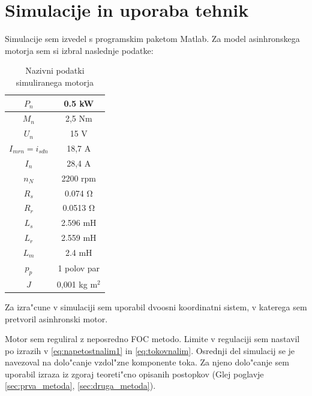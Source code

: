 \documentclass[journal,a4paper,twoside]{sty/IEEEtran}
\begin{document}
\section{Simulacije in uporaba tehnik}
Simulacije sem izvedel s programskim paketom Matlab. 
Za model asinhronskega motorja sem si izbral naslednje podatke:
\begin{table}
\centering
\label{tab:nazivni_podatki_motorja}
\caption{Nazivni podatki simuliranega motorja}
\begin{tabular}{|c|c|}
\hline
	$P_n$		&0.5 kW \\\hline
	$M_n$		&2,5 Nm \\\hline
	$U_n$		&	15 V\\\hline
	$I_{mrn}= i_{sdn}$&	18,7 A\\\hline
	$I_n $		&	28,4 A\\\hline
	$n_N $		&	2200 rpm\\\hline
	$R_s$		&	0.074 $\mathrm{\Omega}$\\\hline
	$R_r$		&	0.0513 $\mathrm{\Omega}$\\\hline
	$L_s $		&	2.596 mH\\\hline
	$L_r $		&	2.559 mH\\\hline
	$L_m $		&	2.4 mH\\\hline
	$p_p $		& 	1 polov par	\\\hline
	$J$			&	0,001 kg $\mathrm{m}^2$	\\\hline										
\end{tabular}
\end{table}



Za izra"cune v simulaciji sem uporabil dvoosni koordinatni sistem, v katerega sem pretvoril asinhronski motor.




Motor sem reguliral z neposredno FOC metodo. Limite v regulaciji sem nastavil po izrazih v \ref{eq:napetostnalim1} in \ref{eq:tokovnalim}.
Osrednji del simulacij se je navezoval na dolo"canje vzdol"zne komponente toka. Za njeno dolo"canje sem uporabil izraza iz zgoraj teoreti"cno opisanih postopkov (Glej poglavje \ref{sec:prva_metoda}, \ref{sec:druga_metoda}).
\end{document}
